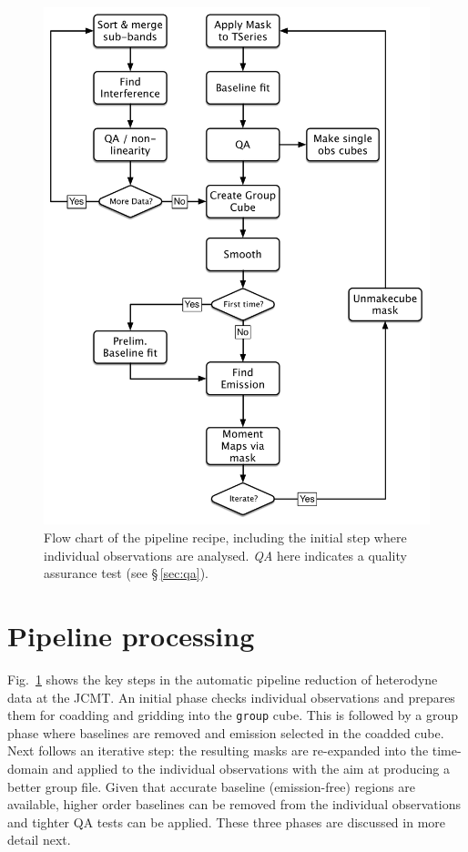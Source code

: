 \documentclass[final,authoryear,5p,times,twocolumn]{elsarticle}
\begin{document}
\begin{figure}[t]
\includegraphics[width=\columnwidth]{flowchart}
\caption{Flow chart of the pipeline recipe, including the initial step
  where individual observations are analysed. \emph{QA} here indicates
a quality assurance test (see \S\,\ref{sec:qa}).
}
\label{fig:flowchart}
\end{figure}

\section{Pipeline processing}

Fig.\ \ref{fig:flowchart} shows the key steps in the automatic
pipeline reduction of heterodyne data at the JCMT. An initial phase
checks individual observations and prepares them for coadding and
gridding into the \texttt{group} cube. This is followed by a group
phase where baselines are removed and emission selected in the coadded
cube.  Next follows an iterative step: the resulting masks are
re-expanded into the time-domain and applied to the individual
observations with the aim at producing a better group file. Given that
accurate baseline (emission-free) regions are available, higher
order baselines can be removed from the individual observations and
tighter QA tests can be applied. These three phases are discussed in
more detail next.
\end{document}
